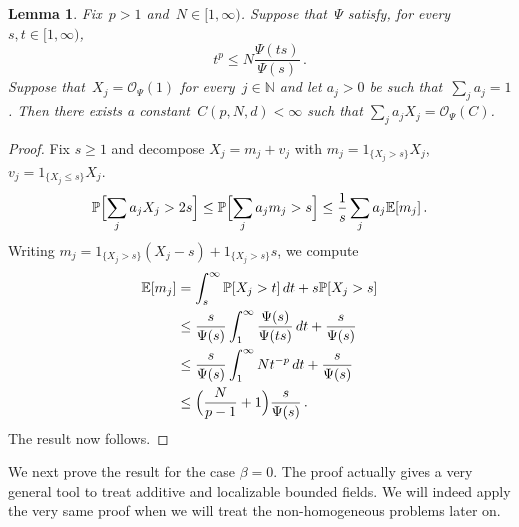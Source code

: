\documentclass[11pt]{article} %
\numberwithin{equation}{section}
\newtheorem{lemma}[theorem]{Lemma}
\theoremstyle{definition}
\newcommand*{\N}{\ensuremath{\mathbb{N}}}
\renewcommand{\P}{\mathbb{P}}
\newcommand{\E}{\mathbb{E}}
\renewcommand{\O}{\mathcal{O}}
\newcommand{\indc}{1}
\begin{document}
\begin{lemma} 
\label{e.supp.you.up}
Fix~$p>1$ and~$N \in [1,\infty)$. Suppose that~$\Psi$ satisfy, for every $s, t \in [1,\infty)$,
\begin{equation}  \label{e.Psi.pgrowth.supplementary1}
t^p \leq N \frac{\Psi(t s)}{\Psi(s)}\,.
\end{equation}
Suppose that~$X_j = \O_{\Psi}(1)$ for every~$j \in \N$ and let $a_j>0$ be such that~$\sum_j a_j =1$. Then there exists a constant~$C(p,N,d) < \infty$ such that $\sum_{j} a_j X_j = \O_\Psi(C)$.  
\end{lemma}
\begin{proof}
Fix $s \geq 1$ and decompose $X_j = m_j + v_j$ with $m_j = \indc_{\{X_j>s \} } X_j $, $v_j = \indc_{\{X_j \leq s\} } X_j $. 
\begin{equation*}  
\P\Bigl[ \sum_j a_j X_j > 2 s \Bigr] \leq \P\Bigl[ \sum_j a_j m_j > s \Bigr] 
\leq
\frac{1}{s}\sum_{j} a_j \E[m_j]
\,.
\end{equation*}
Writing $m_j = \indc_{\{X_j > s \} } (X_j -s) + \indc_{\{X_j > s \} } s$, we compute
\begin{align*}  
\E[m_j] 
& 
= 
\int_{s}^{\infty} \P[X_j  > t ] \, dt + s \P [ X_j > s]
\\ & 
\leq  
\frac{s}{\Psi(s)} \int_{1}^{\infty} \frac{\Psi(s)}{\Psi(t s)} \, dt +  \frac{s}{\Psi(s)}
\\ & 
\leq  
\frac{s}{\Psi(s)} \int_{1}^{\infty} N t^{-p} \, dt +   \frac{s}{\Psi(s)}
\\ & 
\leq  
\Bigl( \frac{N}{p-1} +1 \Bigr) \frac{s}{\Psi(s)} 
\,.
\end{align*}
The result now follows.
\end{proof}







We next prove the result for the case $\beta = 0$. The proof actually gives a very general tool to treat additive and localizable bounded fields. We will indeed apply the very same proof when we will treat the non-homogeneous problems later on. 
   
\end{document}
